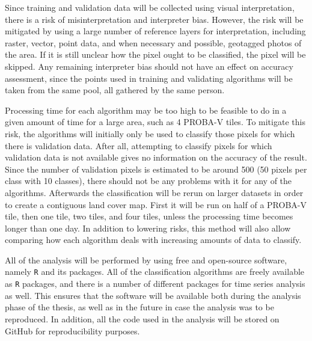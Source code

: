 \documentclass[a4paper,10pt]{article}
\begin{document}
Since training and validation data will be collected using visual interpretation, there is a risk of misinterpretation and interpreter bias. However, the risk will be mitigated by using a large number of reference layers for interpretation, including raster, vector, point data, and when necessary and possible, geotagged photos of the area. If it is still unclear how the pixel ought to be classified, the pixel will be skipped. Any remaining interpreter bias should not have an effect on accuracy assessment, since the points used in training and validating algorithms will be taken from the same pool, all gathered by the same person.

Processing time for each algorithm may be too high to be feasible to do in a given amount of time for a large area, such as 4 PROBA-V tiles. To mitigate this risk, the algorithms will initially only be used to classify those pixels for which there is validation data. After all, attempting to classify pixels for which validation data is not available gives no information on the accuracy of the result. Since the number of validation pixels is estimated to be around 500 (50 pixels per class with 10 classes), there should not be any problems with it for any of the algorithms. Afterwards the classification will be rerun on larger datasets in order to create a contiguous land cover map. First it will be run on half of a PROBA-V tile, then one tile, two tiles, and four tiles, unless the processing time becomes longer than one day. In addition to lowering risks, this method will also allow comparing how each algorithm deals with increasing amounts of data to classify.

All of the analysis will be performed by using free and open-source software, namely \texttt{R} and its packages. All of the classification algorithms are freely available as \texttt{R} packages, and there is a number of different packages for time series analysis as well. This ensures that the software will be available both during the analysis phase of the thesis, as well as in the future in case the analysis was to be reproduced. In addition, all the code used in the analysis will be stored on GitHub for reproducibility purposes.


\end{document}

